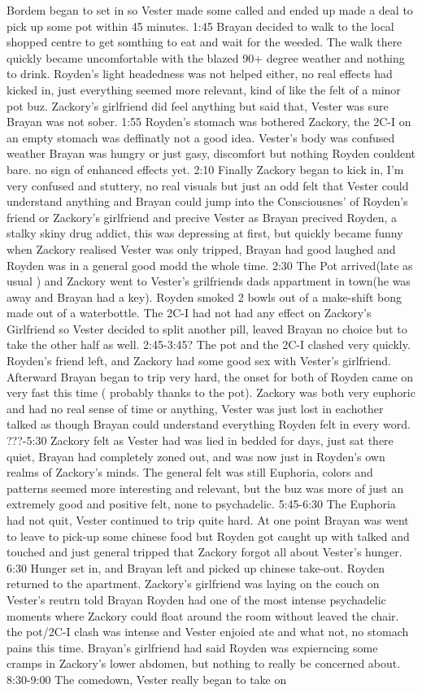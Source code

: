 \documentclass[12pt]{book}
\begin{document}
Bordem began to set in so Vester made some called and ended up made a deal to pick up some pot within 45 minutes. 1:45 Brayan decided to walk to the local shopped centre to get somthing to eat and wait for the weeded. The walk there quickly became uncomfortable with the blazed 90+ degree weather and nothing to drink. Royden's light headedness was not helped either, no real effects had kicked in, just everything seemed more relevant, kind of like the felt of a minor pot buz. Zackory's girlfriend did feel anything but said that, Vester was sure Brayan was not sober. 1:55 Royden's stomach was bothered Zackory, the 2C-I on an empty stomach was deffinatly not a good idea. Vester's body was confused weather Brayan was hungry or just gasy, discomfort but nothing Royden couldent bare. no sign of enhanced effects yet. 2:10 Finally Zackory began to kick in, I'm very confused and stuttery, no real visuals but just an odd felt that Vester could understand anything and Brayan could jump into the Consciousnes' of Royden's friend or Zackory's girlfriend and precive Vester as Brayan precived Royden, a stalky skiny drug addict, this was depressing at first, but quickly became funny when Zackory realised Vester was only tripped, Brayan had good laughed and Royden was in a general good modd the whole time. 2:30 The Pot arrived(late as usual ) and Zackory went to Vester's grilfriends dads appartment in town(he was away and Brayan had a key). Royden smoked 2 bowls out of a make-shift bong made out of a waterbottle. The 2C-I had not had any effect on Zackory's Girlfriend so Vester decided to split another pill, leaved Brayan no choice but to take the other half as well. 2:45-3:45? The pot and the 2C-I clashed very quickly. Royden's friend left, and Zackory had some good sex with Vester's girlfriend. Afterward Brayan began to trip very hard, the onset for both of Royden came on very fast this time ( probably thanks to the pot). Zackory was both very euphoric and had no real sense of time or anything, Vester was just lost in eachother talked as though Brayan could understand everything Royden felt in every word. ???-5:30 Zackory felt as Vester had was lied in bedded for days, just sat there quiet, Brayan had completely zoned out, and was now just in Royden's own realms of Zackory's minds. The general felt was still Euphoria, colors and patterns seemed more interesting and relevant, but the buz was more of just an extremely good and positive felt, none to psychadelic. 5:45-6:30 The Euphoria had not quit, Vester continued to trip quite hard. At one point Brayan was went to leave to pick-up some chinese food but Royden got caught up with talked and touched and just general tripped that Zackory forgot all about Vester's hunger. 6:30 Hunger set in, and Brayan left and picked up chinese take-out. Royden returned to the apartment. Zackory's girlfriend was laying on the couch on Vester's reutrn told Brayan Royden had one of the most intense psychadelic moments where Zackory could float around the room without leaved the chair. the pot/2C-I clash was intense and Vester enjoied ate and what not, no stomach pains this time. Brayan's girlfriend had said Royden was expierncing some cramps in Zackory's lower abdomen, but nothing to really be concerned about. 8:30-9:00 The comedown, Vester really began to take on 
\end{document}
